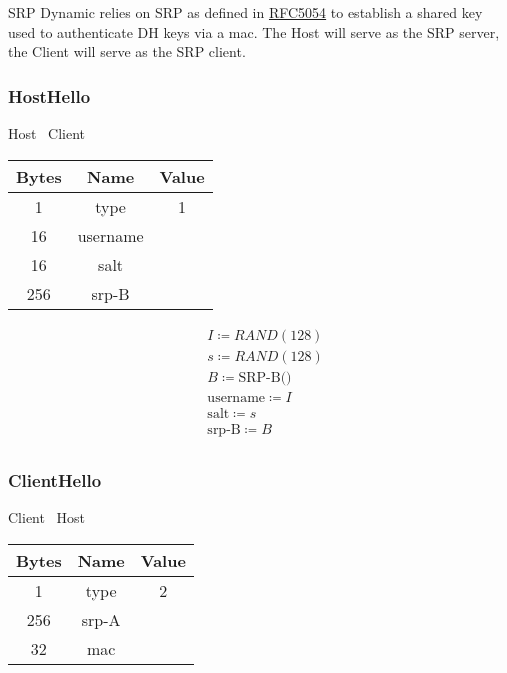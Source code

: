 SRP Dynamic relies on SRP as defined in \href{https://datatracker.ietf.org/doc/html/rfc5054}{RFC5054} to establish a
shared key used to authenticate DH keys via a mac. The Host will serve as the SRP server, the Client will serve as the SRP
client.\\

\subsubsection{HostHello}

\begin{center}
    Host \textrightarrow\ Client\\
    \begin{tabular}{|c|c|c|}
        \hline
        \textbf{Bytes} & \textbf{Name} & \textbf{Value} \\
        \hline
        1              & type          & 1              \\
        \hline
        16             & username      &                \\
        \hline
        16             & salt          &                \\
        \hline
        256             & srp-B         &                \\
        \hline
    \end{tabular}
\end{center}

\begin{align*}
    & I \coloneqq RAND(128)\\
    & s \coloneqq RAND(128)\\
    & B \coloneqq \text{SRP-B()}\\
    & \text{username} \coloneqq I\\
    & \text{salt} \coloneqq s\\
    & \text{srp-B} \coloneqq B\\
\end{align*}

\subsubsection{ClientHello}

\begin{center}
    Client \textrightarrow\ Host\\
    \begin{tabular}{|c|c|c|}
        \hline
        \textbf{Bytes} & \textbf{Name} & \textbf{Value} \\
        \hline
        1              & type          & 2              \\
        \hline
        256             & srp-A         &                \\
        \hline
        32             & mac           &                \\
        \hline
    \end{tabular}
\end{center}

